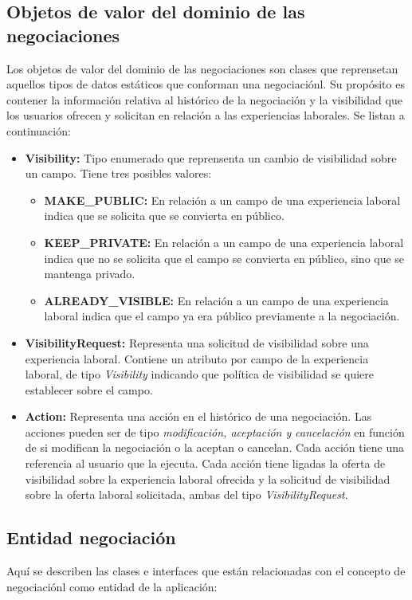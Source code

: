 \documentclass[a4paper, 12pt]{book}
\begin{document}
\subsection{Objetos de valor del dominio de las negociaciones}
\label{subsec:negotiation_value_objects}
Los objetos de valor del dominio de las negociaciones son clases que reprensetan aquellos tipos de datos estáticos que conforman una negociaciónl. 
Su propósito es contener la información relativa al histórico de la negociación y la visibilidad que los usuarios ofrecen y solicitan en relación a las experiencias laborales.
Se listan a continuación:

	\begin{itemize}
	\item \textbf{Visibility:} Tipo enumerado que reprensenta un cambio de visibilidad sobre un campo. Tiene tres posibles valores:
		\begin{itemize}
		\item \textbf{MAKE\_PUBLIC:} En relación a un campo de una experiencia laboral indica que se solicita que se convierta en público.
		\item \textbf{KEEP\_PRIVATE:} En relación a un campo de una experiencia laboral indica que no se solicita que el campo se convierta en público, sino que se mantenga privado.
		\item \textbf{ALREADY\_VISIBLE:} En relación a un campo de una experiencia laboral indica que el campo ya era público previamente a la negociación.
		\end{itemize}
	\item \textbf{VisibilityRequest:} Representa una solicitud de visibilidad sobre una experiencia laboral. Contiene un atributo por campo de la experiencia laboral, de tipo \emph{Visibility} indicando que política de visibilidad se quiere establecer sobre el campo.
	\item\textbf{Action:} Representa una acción en el histórico de una negociación. Las acciones pueden ser de tipo \emph{modificación, aceptación y cancelación} en función de si modifican la negociación o la aceptan o cancelan. 
	Cada acción tiene una referencia al usuario que la ejecuta.
	Cada acción tiene ligadas la oferta de visibilidad sobre la experiencia laboral ofrecida y la solicitud de visibilidad sobre la oferta laboral solicitada, ambas del tipo \emph{VisibilityRequest}.
	\end{itemize}


\subsection{Entidad negociación}
\label{subsec:negotiation_entity}
Aquí se describen las clases e interfaces que están relacionadas con el concepto de negociaciónl como entidad de la aplicación:
\end{document}
